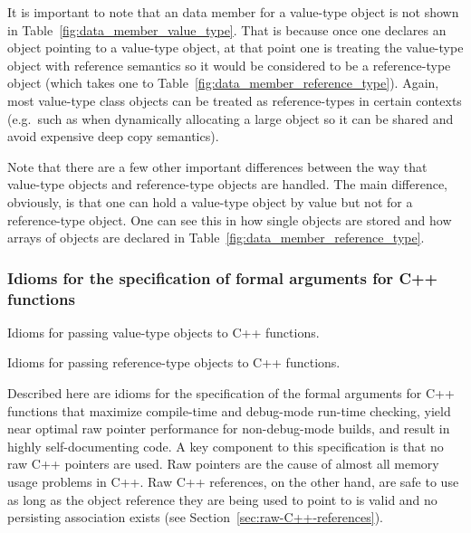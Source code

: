 \documentclass[pdf,ps2pdf,11pt]{SANDreport}
\begin{document}
It is important to note that an {} data member for a
value-type object is not shown in
Table~\ref{fig:data_member_value_type}.  That is because once one
declares an {} object pointing to a value-type object, at
that point one is treating the value-type object with reference
semantics so it would be considered to be a reference-type object
(which takes one to Table~\ref{fig:data_member_reference_type}).
Again, most value-type class objects can be treated as reference-types
in certain contexts (e.g.\ such as when dynamically allocating a large
{} object so it can be shared and avoid expensive deep copy
semantics).

Note that there are a few other important differences between the way
that value-type objects and reference-type objects are handled.  The
main difference, obviously, is that one can hold a value-type object
by value but not for a reference-type object.  One can see this in how
single objects are stored and how arrays of objects are declared in
Table~\ref{fig:data_member_reference_type}.


%
{}\subsubsection{Idioms for the specification of formal arguments for
C++ functions}
\label{sec:idioms-for-passing-arguments}
%

\begin{table}[p]
%
\begin{center}
%
%

%
%
%
\end{center}
\caption{\label{fig:func_args_value_type}
Idioms for passing value-type objects to C++ functions.}
%
\end{table}


\begin{table}[p]
%
\begin{center}

\end{center}
\caption{\label{fig:func_args_ref_type}
Idioms for passing reference-type objects to C++ functions.}
\end{table}


Described here are idioms for the specification of the formal
arguments for C++ functions that maximize compile-time and debug-mode
run-time checking, yield near optimal raw pointer performance for
non-debug-mode builds, and result in highly self-documenting code.  A
key component to this specification is that no raw C++ pointers are
used.  Raw pointers are the cause of almost all memory usage problems
in C++.  Raw C++ references, on the other hand, are safe to use as
long as the object reference they are being used to point to is valid
and no persisting association exists (see
Section~\ref{sec:raw-C++-references}).
\end{document}
